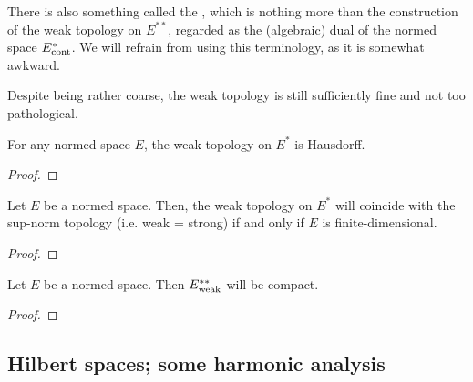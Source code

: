         \begin{convention}
            There is also something called the , which is nothing more than the construction of the weak topology on $E^{**}$, regarded as the (algebraic) dual of the normed space $E^*_{\mathrm{cont}}$. We will refrain from using this terminology, as it is somewhat awkward.
        \end{convention}
        Despite being rather coarse, the weak topology is still sufficiently fine and not too pathological.
        \begin{lemma} \label{lemma: weak_topology_is_hausdorff}
            For any normed space $E$, the weak topology on $E^*$ is Hausdorff.
        \end{lemma}
            \begin{proof}
            \end{proof}
        \begin{theorem} \label{theorem: finite_dimensional_weak_duality}
            Let $E$ be a normed space. Then, the weak topology on $E^*$ will coincide with the sup-norm topology (i.e. weak = strong) if and only if $E$ is finite-dimensional.
        \end{theorem}
            \begin{proof}
                
            \end{proof}
        \begin{theorem} \label{theorem: banach_alaoglu}
            Let $E$ be a normed space. Then $E^{**}_{\mathrm{weak}}$ will be compact.
        \end{theorem}
            \begin{proof}
                
            \end{proof}

    \subsection{Hilbert spaces; some harmonic analysis}